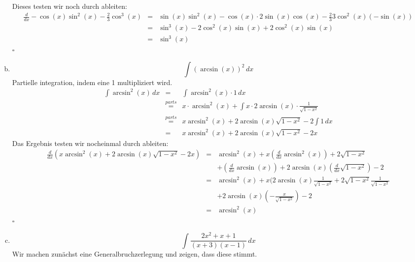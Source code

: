 \documentclass[11pt,a4paper,ngerman]{article}
\begin{document}
\begin{enumerate}[a.]
        Dieses testen wir noch durch ableiten:
        $$\begin{array}{rcl}
               \frac{d}{dx} -\cos(x)\sin^2(x) - \frac{2}{3}\cos^3(x)
                    &=& \sin(x)\sin^2(x) - \cos(x)\cdot 2\sin(x)\cos(x) - \frac{2}{3} 3 \cos^2(x) (-\sin(x))\\
                    &=& \sin^3(x) - 2\cos^2(x)\sin(x) + 2 \cos^2(x)\sin(x)\\    
                    &=& \sin^3(x) 
        \end{array}$$
        \mbox{}\hfill $\square$
    \item
        $$
           \int \left( \arcsin (x) \right)^2 \, dx
        $$
        Partielle integration, indem eine 1 multipliziert wird.
        $$\begin{array}{rcl}
            \int \arcsin^2 (x) \, dx &=& \int \arcsin^2(x) \cdot 1 \, dx\\
                &\stackrel{parts}{=}& 
                    x \cdot \arcsin^2(x) + \int x \cdot 2\arcsin(x)\cdot \frac{1}{\sqrt{1-x^2}}\\
                &\stackrel{parts}{=}&
                    x\arcsin^2(x) + 2 \arcsin(x)\sqrt{1-x^2} - 2 \int 1 \, dx\\
                &=& x\arcsin^2(x) + 2\arcsin(x)\sqrt{1-x^2} - 2x 
        \end{array}$$
        Das Ergebnis testen wir nocheinmal durch ableiten:
        $$\begin{array}{rcl}
            \frac{d}{dx} \left( x\arcsin^2(x) + 2\arcsin(x)\sqrt{1-x^2} - 2x\right)
                &=& \arcsin^2(x) + x(\frac{d}{dx} \arcsin^2(x)) + 2\sqrt{1-x^2}\\
                &&    +(\frac{d}{dx} \arcsin(x)) + 2\arcsin(x) (\frac{d}{dx} \sqrt{1-x^2}) - 2\\
                &=& \arcsin^2(x) + x(2\arcsin(x)\frac{1}{\sqrt{1-x^2}} + 2\sqrt{1-x^2}\frac{1}{\sqrt{1-x^2}}\\
                &&    + 2 \arcsin(x) (-\frac{x}{\sqrt{1-x^2}}) - 2\\
                &=& \arcsin^2(x)
        \end{array}$$
        \mbox{} \hfill $\square$
    \item
        $$
            \int \frac{2x^2 + x + 1}{(x+3)(x-1)} \, dx
        $$
        Wir machen zunächst eine Generalbruchzerlegung und zeigen, dass diese stimmt.
\end{enumerate}
\end{document}
